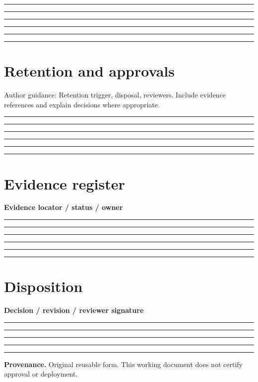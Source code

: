 \documentclass[11pt,letterpaper]{article}
\newcommand{\ResponseLine}{\par\vspace{1.05em}\noindent\rule{\linewidth}{0.4pt}\par}
\newcommand{\ResponseArea}{\ResponseLine\ResponseLine\ResponseLine}
\begin{document}
\ResponseArea\ResponseArea
\section{Retention and approvals}
Author guidance: Retention trigger, disposal, reviewers. Include evidence references and explain decisions where appropriate.


\ResponseArea\ResponseArea
\section{Evidence register}
\textbf{Evidence locator / status / owner}\ResponseArea\ResponseArea
\section{Disposition}
\textbf{Decision / revision / reviewer signature}\ResponseArea\ResponseLine
\vfill
\hrule
{\footnotesize\textbf{Provenance.} Original reusable form. This working document does not certify approval or deployment.}
\end{document}
